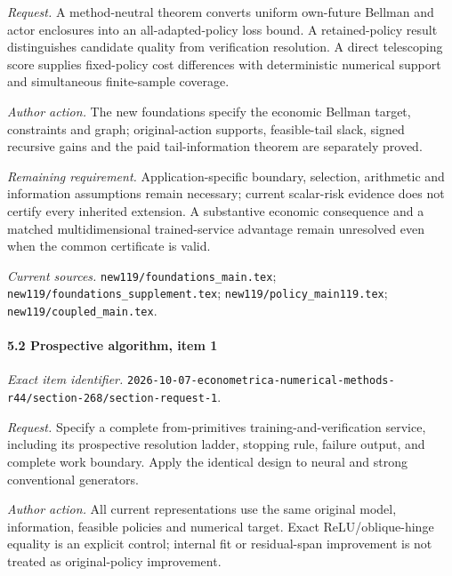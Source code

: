 \par\emph{Request.} A method-neutral theorem converts uniform own-future Bellman and actor enclosures into an all-adapted-policy loss bound. A retained-policy result distinguishes candidate quality from verification resolution. A direct telescoping score supplies fixed-policy cost differences with deterministic numerical support and simultaneous finite-sample coverage.

\par\emph{Author action.} The new foundations specify the economic Bellman target, constraints and graph; original-action supports, feasible-tail slack, signed recursive gains and the paid tail-information theorem are separately proved.

\par\emph{Remaining requirement.} Application-specific boundary, selection, arithmetic and information assumptions remain necessary; current scalar-risk evidence does not certify every inherited extension. A substantive economic consequence and a matched multidimensional trained-service advantage remain unresolved even when the common certificate is valid.

\par\emph{Current sources.} \nolinkurl{new119/foundations_main.tex}; \nolinkurl{new119/foundations_supplement.tex}; \nolinkurl{new119/policy_main119.tex}; \nolinkurl{new119/coupled_main.tex}.

\paragraph{5.2 Prospective algorithm, item 1}

\emph{Exact item identifier.} \nolinkurl{2026-10-07-econometrica-numerical-methods-r44/section-268/section-request-1}.

\par\emph{Request.} Specify a complete from-primitives training-and-verification service, including its prospective resolution ladder, stopping rule, failure output, and complete work boundary. Apply the identical design to neural and strong conventional generators.

\par\emph{Author action.} All current representations use the same original model, information, feasible policies and numerical target. Exact ReLU/\allowbreak{}oblique-hinge equality is an explicit control; internal fit or residual-span improvement is not treated as original-policy improvement.

